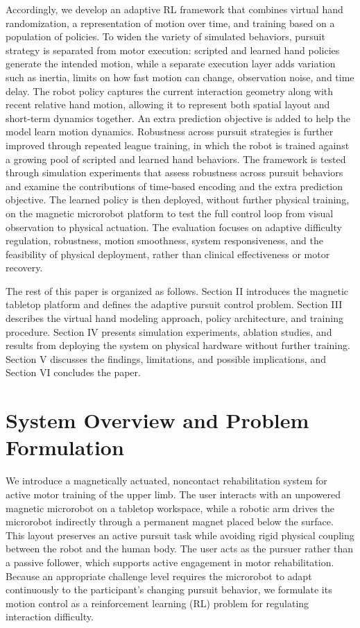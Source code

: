 \documentclass[journal,twoside,web]{ieeecolor2}
\begin{document}
Accordingly, we develop an adaptive RL framework that combines virtual hand randomization, a representation of motion over time, and training based on a population of policies. To widen the variety of simulated behaviors, pursuit strategy is separated from motor execution: scripted and learned hand policies generate the intended motion, while a separate execution layer adds variation such as inertia, limits on how fast motion can change, observation noise, and time delay. The robot policy captures the current interaction geometry along with recent relative hand motion, allowing it to represent both spatial layout and short-term dynamics together. An extra prediction objective is added to help the model learn motion dynamics. Robustness across pursuit strategies is further improved through repeated league training, in which the robot is trained against a growing pool of scripted and learned hand behaviors. The framework is tested through simulation experiments that assess robustness across pursuit behaviors and examine the contributions of time-based encoding and the extra prediction objective. The learned policy is then deployed, without further physical training, on the magnetic microrobot platform to test the full control loop from visual observation to physical actuation. The evaluation focuses on adaptive difficulty regulation, robustness, motion smoothness, system responsiveness, and the feasibility of physical deployment, rather than clinical effectiveness or motor recovery.

The rest of this paper is organized as follows. Section II introduces the magnetic tabletop platform and defines the adaptive pursuit control problem. Section III describes the virtual hand modeling approach, policy architecture, and training procedure. Section IV presents simulation experiments, ablation studies, and results from deploying the system on physical hardware without further training. Section V discusses the findings, limitations, and possible implications, and Section VI concludes the paper.

\section{System Overview and Problem Formulation}
We introduce a magnetically actuated, noncontact rehabilitation system for active motor training of the upper limb. The user interacts with an unpowered magnetic microrobot on a tabletop workspace, while a robotic arm drives the microrobot indirectly through a permanent magnet placed below the surface. This layout preserves an active pursuit task while avoiding rigid physical coupling between the robot and the human body. The user acts as the pursuer rather than a passive follower, which supports active engagement in motor rehabilitation. Because an appropriate challenge level requires the microrobot to adapt continuously to the participant's changing pursuit behavior, we formulate its motion control as a reinforcement learning (RL) problem for regulating interaction difficulty.
\end{document}
